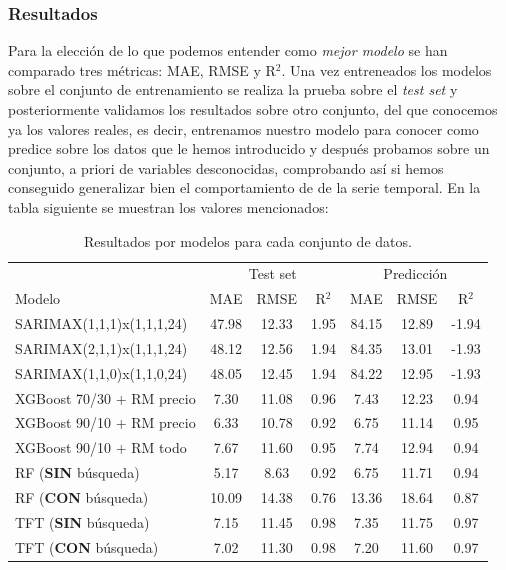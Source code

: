 \subsubsection{Resultados}
%
%
%
Para la elección de lo que podemos entender como \textit{mejor modelo} se han comparado tres métricas: MAE, RMSE y R$^2$. Una vez entreneados los modelos sobre el conjunto de entrenamiento se realiza la prueba sobre el \textit{test set} y posteriormente validamos los resultados sobre otro conjunto, del que conocemos ya los valores reales, es decir, entrenamos nuestro modelo para conocer como predice sobre los datos que le hemos introducido y después probamos sobre un conjunto, a priori de variables desconocidas, comprobando así si hemos conseguido generalizar bien el comportamiento de de la serie temporal. En la tabla siguiente se muestran los valores mencionados:
\begin{table}[H]
    \centering
    \begin{tabular}{l|ccc|ccc}
        & \multicolumn{3}{c}{Test set} & \multicolumn{3}{c}{Predicción} \\
        Modelo & MAE & RMSE & R$^2$ & MAE & RMSE & R$^2$ \\
        \hline
        SARIMAX(1,1,1)x(1,1,1,24) & 47.98 & 12.33 & 1.95 & 84.15 & 12.89 & -1.94 \\
        SARIMAX(2,1,1)x(1,1,1,24) & 48.12 & 12.56 & 1.94 & 84.35 & 13.01 & -1.93 \\
        SARIMAX(1,1,0)x(1,1,0,24) & 48.05 & 12.45 & 1.94 & 84.22 & 12.95 & -1.93 \\
        XGBoost 70/30 + RM precio  & 7.30  & 11.08 & 0.96 & 7.43  & 12.23 & 0.94 \\
        XGBoost 90/10 + RM precio  & 6.33  & 10.78 & 0.92 & 6.75  & 11.14 & 0.95 \\
        XGBoost 90/10 + RM todo    & 7.67  & 11.60 & 0.95 & 7.74  & 12.94 & 0.94 \\
        RF (\textbf{SIN} búsqueda) & 5.17  & 8.63  & 0.92 & 6.75  & 11.71 & 0.94 \\
        RF (\textbf{CON} búsqueda) & 10.09 & 14.38 & 0.76 & 13.36 & 18.64 & 0.87 \\
        TFT (\textbf{SIN} búsqueda)& 7.15  & 11.45 & 0.98 & 7.35  & 11.75 & 0.97 \\
        TFT (\textbf{CON} búsqueda)& 7.02  & 11.30 & 0.98 & 7.20  & 11.60 & 0.97 \\
    \end{tabular}
    \caption{Resultados por modelos para cada conjunto de datos.}
    \label{tab:resultados_modelos}
\end{table}

